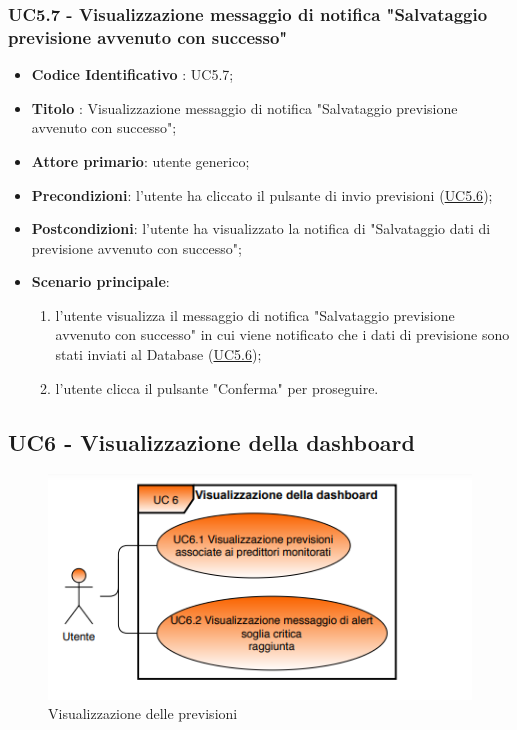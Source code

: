 	\label{par:UC5.7}
	\subsubsection{UC5.7 - Visualizzazione messaggio di notifica "Salvataggio previsione avvenuto con successo"}	\begin{itemize}
			\item\textbf{Codice Identificativo} : UC5.7;
			\item\textbf{Titolo} : Visualizzazione messaggio di notifica "Salvataggio previsione avvenuto con successo";
			\item\textbf{Attore primario}: utente generico;
			\item\textbf{Precondizioni}: l'utente ha cliccato il pulsante di invio previsioni (\hyperref[par:UC5.6]{UC5.6});
			\item\textbf{Postcondizioni}: l'utente ha visualizzato la notifica di "Salvataggio dati di previsione avvenuto con successo";
			\item\textbf{Scenario principale}:
				\begin{enumerate}
					\item l'utente visualizza il messaggio di notifica "Salvataggio previsione avvenuto con successo" in cui viene notificato che i dati di previsione sono stati inviati al Database (\hyperref[par:UC5.6]{UC5.6});
					\item l'utente clicca il pulsante "Conferma" per proseguire.		
				\end{enumerate}		
		\end{itemize}



	\label{par:UC6}
	\subsection{UC6 - Visualizzazione della dashboard}

	\begin{figure}[H]
		\centering
		\includegraphics[scale=0.80]{../Analisi_dei_requisiti/img/Diagrammi_UML/UC6_Visualizzazione_della_dashboard.png}
		\caption{Visualizzazione delle previsioni}
	\end{figure}

